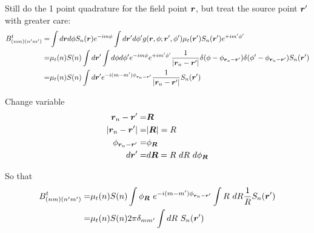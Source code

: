 \documentclass [10pt,letterpaper]{article}
\begin{document}
Still do the 1 point quadrature for the field point $\vectorsym{r}$, but treat the source point $\vectorsym{r}^\prime$ with greater care:
\begin{equation} \label{eq:der-Btnmnpmp-diagonal-1pt-1}
	\begin{split}
		B^t_{(n m)(n^\prime m^\prime)}
		=&
		\int d\vectorsym{r} d\phi
		S_n(\vectorsym{r})
		e^{-i m \phi}
		\int d\vectorsym{r}^\prime d\phi^\prime
		g(\vectorsym{r},\phi;\vectorsym{r}^\prime,\phi^\prime)
		\mu_t(\vectorsym{r}^\prime)
		S_n(\vectorsym{r}^\prime)
		e^{+i m^\prime \phi^\prime}
		\\
		=&
		\mu_t(n) S(n)
		\int d\vectorsym{r}^\prime
		\int d\phi d\phi^\prime
		e^{-i m \phi}
		e^{+i m^\prime \phi^\prime}
		\frac{1}{\lvert\vectorsym{r}_n-\vectorsym{r}^\prime\rvert}
		\delta(\phi-\phi_{\vectorsym{r}_n-\vectorsym{r}^\prime})
		\delta(\phi^\prime-\phi_{\vectorsym{r}_n-\vectorsym{r}^\prime})
		S_n(\vectorsym{r}^\prime)
		\\
		=&
		\mu_t(n) S(n)
		\int d\vectorsym{r}^\prime
		e^{-i (m-m^\prime) \phi_{\vectorsym{r}_n-\vectorsym{r}^\prime}}
		\frac{1}{\lvert\vectorsym{r}_n-\vectorsym{r}^\prime\rvert}
		S_n(\vectorsym{r}^\prime)
	\end{split}
\end{equation}

Change variable
\begin{equation} \label{eq:der-change-variable}
	\begin{split}
		\vectorsym{r}_n-\vectorsym{r}^\prime
		=&
		\vectorsym{R}
		\\
		\lvert \vectorsym{r}_n-\vectorsym{r}^\prime \rvert 
		=&
		\lvert \vectorsym{R} \rvert = R
		\\
		\phi_{\vectorsym{r}_n-\vectorsym{r}^\prime}
		=&
		\phi_{\vectorsym{R}}
		\\
		d\vectorsym{r}^\prime
		=&
		d\vectorsym{R}=R\ dR\ d\phi_{\vectorsym{R}}
	\end{split}
\end{equation}

So that
\begin{equation} \label{eq:der-Btnmnpmp-diagonal-1pt-2}
	\begin{split}
		B^t_{(n m)(n^\prime m^\prime)}
		=& 
		\mu_t(n) S(n)
		\int \phi_{\vectorsym{R}}\ 
		e^{-i (m-m^\prime) \phi_{\vectorsym{r}_n-\vectorsym{r}^\prime}}
		\int R\ dR 
		\frac{1}{R}
		S_n(\vectorsym{r}^\prime)
		\\
		=&
		\mu_t(n) S(n)
		2\pi 
		\delta_{m m^\prime}
		\int dR\  
		S_n(\vectorsym{r}^\prime)
	\end{split}
\end{equation}
\end{document}
